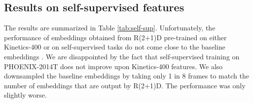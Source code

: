 \documentclass[final]{cvpr}
\begin{document}

\subsection{Results on self-supervised features}
The results are summarized in Table \ref{tab:self-sup}. Unfortunately, the performance of embeddings obtained from R(2+1)D pre-trained on either Kinetics-400 or on self-supervised tasks do not come close to the baseline embeddings \cite{hmm}. We are disappointed by the fact that self-supervised training on PHOENIX-2014T does not improve upon Kinetics-400 features. We also downsampled the baseline embeddings by taking only 1 in 8 frames to match the number of embeddings that are output by R(2+1)D. The performance was only slightly worse.
\end{document}
